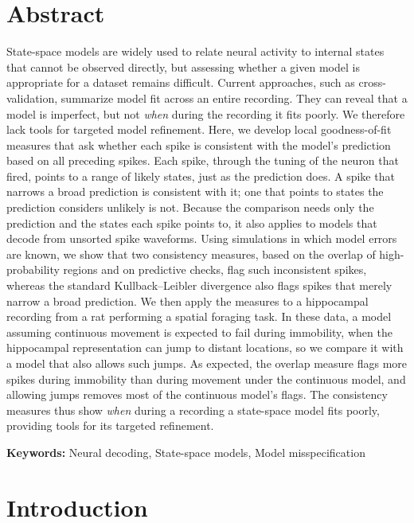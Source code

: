 \documentclass[12pt]{article}
\begin{document}
\section*{Abstract}
\noindent State-space models are widely used to relate neural activity to internal states that cannot be observed directly, but assessing whether a given model is appropriate for a dataset remains difficult. Current approaches, such as cross-validation, summarize model fit across an entire recording. They can reveal that a model is imperfect, but not \emph{when} during the recording it fits poorly. We therefore lack tools for targeted model refinement. Here, we develop local goodness-of-fit measures that ask whether each spike is consistent with the model's prediction based on all preceding spikes. Each spike, through the tuning of the neuron that fired, points to a range of likely states, just as the prediction does. A spike that narrows a broad prediction is consistent with it; one that points to states the prediction considers unlikely is not. Because the comparison needs only the prediction and the states each spike points to, it also applies to models that decode from unsorted spike waveforms. Using simulations in which model errors are known, we show that two consistency measures, based on the overlap of high-probability regions and on predictive checks, flag such inconsistent spikes, whereas the standard Kullback--Leibler divergence also flags spikes that merely narrow a broad prediction. We then apply the measures to a hippocampal recording from a rat performing a spatial foraging task. In these data, a model assuming continuous movement is expected to fail during immobility, when the hippocampal representation can jump to distant locations, so we compare it with a model that also allows such jumps. As expected, the overlap measure flags more spikes during immobility than during movement under the continuous model, and allowing jumps removes most of the continuous model's flags. The consistency measures thus show \emph{when} during a recording a state-space model fits poorly, providing tools for its targeted refinement.

\vspace{0.5em}
\noindent\textbf{Keywords:} Neural decoding, State-space models, Model misspecification


\section*{Introduction}\label{sec:intro}
\end{document}

